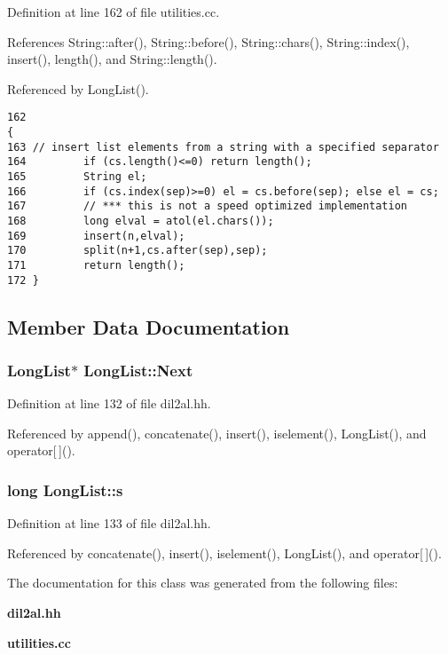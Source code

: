 Definition at line 162 of file utilities.cc.

References String::after(), String::before(), String::chars(), String::index(), insert(), length(), and String::length().

Referenced by Long\-List().



\footnotesize\begin{verbatim}162                                                                                {
163 // insert list elements from a string with a specified separator
164         if (cs.length()<=0) return length();
165         String el;
166         if (cs.index(sep)>=0) el = cs.before(sep); else el = cs;
167         // *** this is not a speed optimized implementation
168         long elval = atol(el.chars());
169         insert(n,elval);
170         split(n+1,cs.after(sep),sep);
171         return length();
172 }
\end{verbatim}\normalsize 


\subsection{Member Data Documentation}
\subsubsection{\setlength{\rightskip}{0pt plus 5cm}Long\-List$\ast$ Long\-List::Next\hspace{0.3cm}{\tt  [protected]}}\label{classLongList_n0}




Definition at line 132 of file dil2al.hh.

Referenced by append(), concatenate(), insert(), iselement(), Long\-List(), and operator[$\,$]().
\subsubsection{\setlength{\rightskip}{0pt plus 5cm}long Long\-List::s\hspace{0.3cm}{\tt  [protected]}}\label{classLongList_n1}




Definition at line 133 of file dil2al.hh.

Referenced by concatenate(), insert(), iselement(), Long\-List(), and operator[$\,$]().

The documentation for this class was generated from the following files:\begin{CompactItemize}
\item 
{\bf dil2al.hh}\item 
{\bf utilities.cc}\end{CompactItemize}
